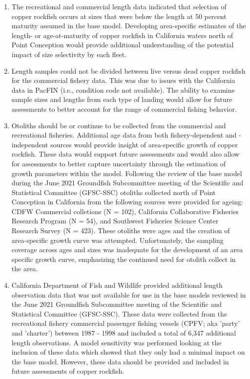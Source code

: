 \documentclass[11pt,
  english,
  a4paper,
]{article}
\begin{document}
\begin{enumerate}

    \item The recreational and commercial length data indicated that selection of copper rockfish occurs at sizes that were below the length at 50 percent maturity assumed in the base model. Developing area-specific estimates of the length- or age-at-maturity of copper rockfish in California waters north of Point Conception would provide additional understanding of the potential impact of size selectivity by each fleet.

    \item Length samples could not be divided between live versus dead copper rockfish for the commercial fishery data. This was due to issues with the California data in PacFIN (i.e., condition code not available). The ability to examine sample sizes and lengths from each type of landing would allow for future assessments to better account for the range of commercial fishing behavior.

    \item Otoliths should be or continue to be collected from the commercial and recreational fisheries. Additional age data from both fishery-dependent and -independent sources would provide insight of area-specific growth of copper rockfish.  These data would support future assessments and would also allow for assessments to better capture uncertainty through the estimation of growth parameters within the model. Following the review of the base model during the June 2021 Groundfish Subcommittee meeting of the Scientific and Statistical Committee (GFSC-SSC) otoliths collected north of Point Conception in California from the following sources were provided for ageing: CDFW Commercial colletions (N = 102), California Collaborative Fisheries Research Program (N = 54), and Southwest Fisheries Science Center Research Survey (N = 423). These otoliths were ages and the creation of area-specific growth curve was attempted. Unfortunately, the sampling coverage across ages and sizes was inadequate for the development of an area specific growth curve, emphasizing the continued need for otolith collect in the area.

    \item California Department of Fish and Wildlife provided additional length observation data that was not available for use in the base models reviewed in the June 2021 Groundfish Subcommittee meeting of the Scientific and Statistical Committee (GFSC-SSC).  These data were collected from the recreational fishery commercial passenger fishing vessels (CPFV; aka 'party' and 'charter') between 1987 - 1998 and included a total of 6,347 additional length observations. A model sensitivity was performed looking at the inclusion of these data which showed that they only had a minimal impact on the base model. However, these data should be provided and included in future assessments of copper rockfish.  

\end{enumerate}
\end{document}
